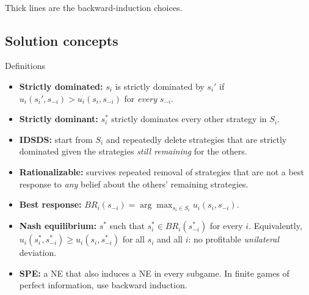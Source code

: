 \documentclass[11pt]{article}
\begin{document}
\begin{center}
\\
\small Thick lines are the backward-induction choices.
\end{center}

\subsection{Solution concepts}
\begin{defbox}{Definitions}
\begin{itemize}
\item \textbf{Strictly dominated:} $s_i$ is strictly dominated by $s_i'$ if $u_i(s_i',s_{-i})>u_i(s_i,s_{-i})$ for \emph{every} $s_{-i}$.
\item \textbf{Strictly dominant:} $s_i^*$ strictly dominates every other strategy in $S_i$.
\item \textbf{IDSDS:} start from $S_i$ and repeatedly delete strategies that are strictly dominated given the strategies \emph{still remaining} for the others.
\item \textbf{Rationalizable:} survives repeated removal of strategies that are not a best response to \emph{any} belief about the others' remaining strategies.
\item \textbf{Best response:} $BR_i(s_{-i})=\arg\max_{s_i\in S_i}u_i(s_i,s_{-i})$.
\item \textbf{Nash equilibrium:} $s^*$ such that $s_i^*\in BR_i(s_{-i}^*)$ for every $i$. Equivalently, $u_i(s_i^*,s_{-i}^*)\ge u_i(s_i,s_{-i}^*)$ for all $s_i$ and all $i$: no profitable \emph{unilateral} deviation.
\item \textbf{SPE:} a NE that also induces a NE in every subgame. In finite games of perfect information, use backward induction.
\end{itemize}
\end{defbox}
\end{document}
